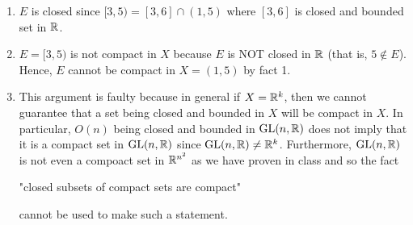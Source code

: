 \documentclass[a4paper]{article}
\begin{document}
\begin{solution}
\begin{enumerate}
    \item  \( E  \) is closed since \( [3,5) = [3,6] \cap (1,5) \) where \( [3,6] \) is closed and bounded set in \( \mathbb{R}  \).
    \item \( E = [3,5) \) is not compact in \( X  \) because \( E  \) is NOT closed in \( \mathbb{R}  \) (that is, \( 5 \notin E  \)). Hence, \( E  \) cannot be compact in \( X = (1,5) \) by fact 1.
    \item This argument is faulty because in general if \( X = \mathbb{R}^{k} \), then we cannot guarantee that a set being closed and bounded in \( X  \) will be compact in \( X  \). In particular, \( O(n) \) being closed and bounded in \( \text{GL}(n,\mathbb{R})  \) does not imply that it is a compact set in \( \text{GL}(n,\mathbb{R})  \) since \( \text{GL}(n,\mathbb{R}) \neq \mathbb{R}^{k} \). Furthermore, \( \text{GL}(n,\mathbb{R})   \) is not even a compoact set in \( \mathbb{R}^{n^{2}} \) as we have proven in class and so the fact 
        \begin{center}
            "closed subsets of compact sets are compact"
        \end{center}
        cannot be used to make such a statement.
\end{enumerate}
\end{solution}
\end{document}
